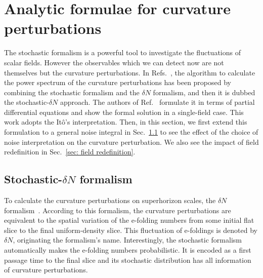 \documentclass[aps, prd
, preprint
, nofootinbib 
, superscriptaddress
, longbibliography
]{revtex4-1}
\begin{document}
\section{Analytic formulae for curvature perturbations}

The stochastic formalism is a powerful tool to investigate the fluctuations of scalar fields. However the observables which we can detect now are not themselves 
but the curvature perturbations. In Refs.~\cite{Fujita:2013cna,Fujita:2014tja}, the algorithm to calculate the power spectrum of the curvature perturbations has been proposed
by combining the stochastic formalism and the $\delta N$ formalism, and then it is dubbed the stochastic-$\delta N$ approach.
The authors of Ref.~\cite{Vennin:2015hra} formulate it in terms of partial differential equations and show the formal solution in a single-field case.
This work adopts the It\^o's interpretation. Then, in this section, we first extend this formulation to a general noise integral in Sec.~\ref{sec: stochastic-delta N}
to see the effect of the choice of noise interpretation on the curvature perturbation. We also see the impact of field redefinition in Sec.~\ref{sec: field redefinition}.





\subsection{Stochastic-$\delta N$ formalism}\label{sec: stochastic-delta N}

To calculate the curvature perturbations on superhorizon scales, the $\delta N$ formalism~\cite{Starobinsky:1986fxa,Salopek:1990jq,Sasaki:1995aw,Sasaki:1998ug,
Lyth:2004gb}. According to this formalism, the curvature perturbations are equivalent to the spatial variation of the e-folding numbers from some initial flat slice
to the final uniform-density slice. This fluctuation of e-foldings is denoted by $\delta N$, originating the formalism's name.
Interestingly, the stochastic formalism automatically makes the e-folding numbers probabilistic. It is encoded as a first passage time to the final slice
and its stochastic distribution has all information of curvature perturbations.
\end{document}
